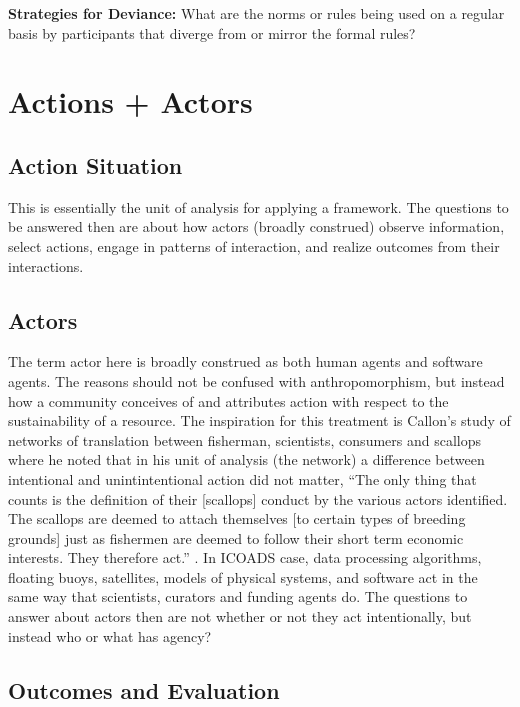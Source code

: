 \documentclass[thesis,tocnosub,noragright,centerchapter,12pt]{uiucecethesis09}
\begin{document}
{\textbf{Strategies for Deviance:} What are the norms or rules being
used on a regular basis by participants that diverge from or mirror the
formal rules? \\

\section*{Actions + Actors}
\subsection*{Action Situation}
This is essentially the unit of analysis for applying a framework. The questions
to be answered then are about how actors (broadly construed) observe
information, select actions, engage in patterns of interaction, and
realize outcomes from their interactions.\\

\subsection*{Actors}
The term actor here is broadly
construed as both human agents and software agents. The reasons should
not be confused with anthropomorphism, but instead how a community
conceives of and attributes action with respect to the sustainability of
a resource. The inspiration for this treatment is Callon's study of
networks of translation between fisherman, scientists, consumers and
scallops where he noted that in his unit of analysis (the network) a
difference between intentional and unintintentional action did not
matter, ``The only thing that counts is the definition of their
{[}scallops{]} conduct by the various actors identified. The scallops
are deemed to attach themselves {[}to certain types of breeding
grounds{]} just as fishermen are deemed to follow their short term
economic interests. They therefore act.'' \citep[p. 25, bracketed
content was added by me for sake of clarification]{callon1986some}. In ICOADS case, data
processing algorithms, floating buoys, satellites, models of physical
systems, and software act in the same way that scientists, curators and
funding agents do. The questions to answer about actors then are not
whether or not they act intentionally, but instead who or what has
agency?\\ 

\subsection*{Outcomes and Evaluation}

}
\end{document}

